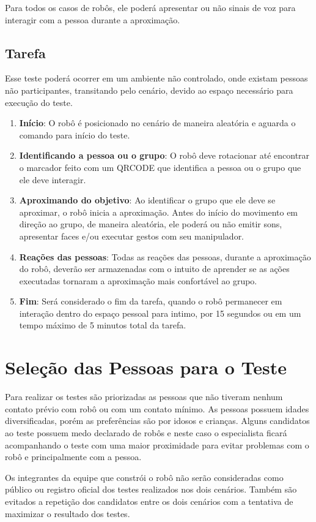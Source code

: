 Para todos os casos de robôs, ele poderá apresentar ou não sinais de voz para interagir com a pessoa durante a aproximação.

\subsection{Tarefa}

Esse teste poderá ocorrer em um ambiente não controlado, onde existam pessoas não participantes, transitando pelo cenário, devido ao espaço necessário para execução do teste.

\begin{enumerate}
	\item \textbf{Início}: O robô é posicionado no cenário de maneira aleatória e aguarda o comando para início do teste.
	\item \textbf{Identificando a pessoa ou o grupo}: O robô deve rotacionar até encontrar o marcador feito com um QRCODE que identifica a pessoa ou o grupo que ele deve interagir.
	\item \textbf{Aproximando do objetivo}: Ao identificar o grupo que ele deve se aproximar, o robô inicia a aproximação. Antes do início do movimento em direção ao grupo, de maneira aleatória, ele poderá ou não emitir sons, apresentar faces e/ou executar gestos com seu manipulador.
	\item \textbf{Reações das pessoas}: Todas as reações das pessoas, durante a aproximação do robô, deverão ser armazenadas com o intuito de aprender se as ações executadas tornaram a aproximação mais confortável ao grupo.
	\item \textbf{Fim}: Será considerado o fim da tarefa, quando o robô permanecer em interação dentro do espaço pessoal para intimo, por 15 segundos ou em um tempo máximo de 5 minutos total da tarefa.
\end{enumerate}

\section{Seleção das Pessoas para o Teste}
\label{sec:perfistestes}
Para realizar os testes são priorizadas as pessoas que não tiveram nenhum contato prévio com robô ou com um contato mínimo. As pessoas possuem idades diversificadas, porém as preferências são por idosos e crianças. Alguns candidatos ao teste possuem medo declarado de robôs e neste caso o especialista ficará acompanhando o teste com uma maior proximidade para evitar problemas com o robô e principalmente com a pessoa.

Os integrantes da equipe que constrói o robô não serão consideradas como público ou registro oficial dos testes realizados nos dois cenários. Também são evitados a repetição dos candidatos entre os dois cenários com a tentativa de maximizar o resultado dos testes.
